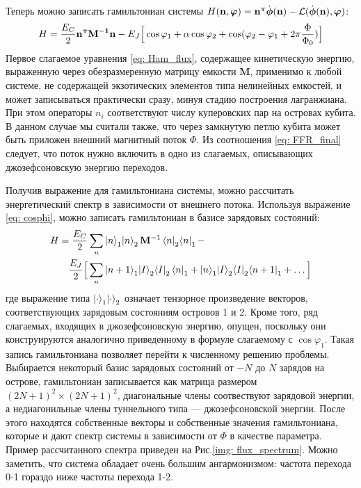 Теперь можно записать гамильтониан системы $H(\mathbf{n}, \boldsymbol{\varphi}) = \mathbf{n^{\mathsmaller T}}\dot{\boldsymbol{\phi}}(\mathbf{n})-\mathcal{L}(\dot{\boldsymbol{\phi}}(\mathbf{n}), \boldsymbol{\varphi})$:
\begin{equation}\label{eq: Ham_flux}
H = \frac{E_C}{2}\mathbf{n^{\mathsmaller T}}\mathbf{M^{-1}}\mathbf{n}-E_J\Big[ \cos\varphi_1+\alpha\cos\varphi_2+\cos(\varphi_2-\varphi_1+2\pi\frac{\Phi}{\Phi_0})\Big]
\end{equation}
Первое слагаемое уравнения \eqref{eq: Ham_flux}, содержащее кинетическую энергию, выраженную через обезразмеренную матрицу емкости $\mathbf{M}$, применимо к любой системе, не содержащей экзотических элементов типа нелинейных емкостей, и может записываться практически сразу, минуя стадию построения лагранжиана. При этом операторы $n_i$ соответствуют числу куперовских пар на островах кубита. В данном случае мы считали также, что через замкнутую петлю кубита может быть приложен внешний магнитный поток $\Phi$. Из соотношения \eqref{eq: FFR_final} следует, что поток нужно включить в одно из слагаемых, описывающих джозефсоновскую энергию переходов. 

Получив выражение для гамильтониана системы, можно рассчитать энергетический спектр в зависимости от внешнего потока. Используя выражение \eqref{eq: cosphi}, можно записать гамильтониан в базисе зарядовых состояний:
\begin{equation}
\begin{aligned}
H = \frac{E_C}{2}&\sum_{n}\ket{n}_1\!\ket{n}_2\mathbf{M}^{-1}\bra{n}_2\!\bra{n}_1-\\\frac{E_J}{2}\Big[&\sum_{n}\ket{n+1}_1\!\ket{I}_2\!\bra{I}_2\bra{n}_1 +\ket{n}_1\!\ket{I}_2\!\bra{I}_2\!\bra{n+1}_1+\ldots\Big]
\end{aligned}
\end{equation}
где выражение типа $\ket{\cdot}_1\!\ket{\cdot}_2$ означает тензорное произведение векторов, соответствующих зарядовым состояниям островов 1 и 2. Кроме того, ряд слагаемых, входящих в джозефсоновскую энергию, опущен, поскольку они конструируются аналогично приведенному в формуле слагаемому с $\cos\varphi_1$. Такая запись гамильтониана позволяет перейти к численному решению проблемы. Выбирается некоторый базис зарядовых состояний от $-N$ до $N$ зарядов на острове, гамильтониан записывается как матрица размером $(2N+1)^2\times (2N+1)^2$, диагональные члены соотвествуют зарядовой энергии, а недиагонильные члены туннельного типа --- джозефсоновской энергии. После этого находятся собственные векторы и собственные значения гамильтониана, которые и дают спектр системы в зависимости от $\Phi$ в качестве параметра. Пример рассчитанного спектра приведен на Рис.\:\ref{img: flux_spectrum}. Можно заметить, что система обладает очень большим ангармонизмом: частота перехода 0-1 гораздо ниже частоты перехода 1-2. 


